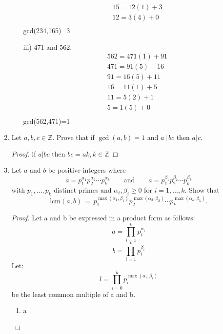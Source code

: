 \documentclass[11pt]{article}
\theoremstyle{definition}  %
\newcommand{\Z}{\mathbb{Z}}
\newcommand{\lcm}{\mathrm{lcm}}
\begin{document}
\begin{enumerate}
\begin{itemize}
\begin{align*}
  &15=12(1)+3\\
  &12=3(4)+0\\
\end{align*}
  gcd(234,165)=3
  \item[iii)] $471$ and $562$.
  \begin{align*}
  &562=471(1)+91\\
  &471=91(5)+16\\
  &91=16(5)+11\\
  &16=11(1)+5\\
  &11=5(2)+1\\
  &5=1(5)+0\\
\end{align*}
gcd(562,471)=1
  \end{itemize}
\item Let $a, b, c \in \Z$. Prove that if $\gcd(a,b) =1$ and $a \, | \, bc$ then $a | c$.
\begin{proof}
if $a|bc$ then $bc=ak,k \in \Z$
\end{proof}

\item Let $a$ and $b$ be positive integers where
  $$ a = p_1^{\alpha_1} p_2^{\alpha_2} \cdots p_k^{\alpha_k}  \quad \quad \mbox{and}  \quad \quad a = p_1^{\beta_1} p_2^{\beta_2} \cdots p_k^{\beta_k}  $$
  with $p_1, \ldots, p_k$ distinct primes and $\alpha_i, \beta_i \geq 0$ for $i=1, \ldots, k$. Show that
  $$ \lcm(a,b) \, = \, p_1^{\max(\alpha_1, \beta_1)} p_2^{\max(\alpha_2, \beta_2)} \cdots p_k^{\max(\alpha_k,\beta_k)}. $$


\begin{proof}
  Let a and b be expressed in a product form as follows:
  \[
    a=\prod_{i=1}^kp_i^{\alpha_i}
  \]
  \[
    b=\prod_{i=1}^kp_i^{\beta_i}
  \]
  Let:
  \[
    l=\prod_{i=0}^kp_i^{\max(\alpha_i,\beta_i)}
  \]
  be the least common multiple of a and b.

  \begin{enumerate}
    \item a
  \end{enumerate}
\end{proof}
 \end{enumerate}
\end{document}
